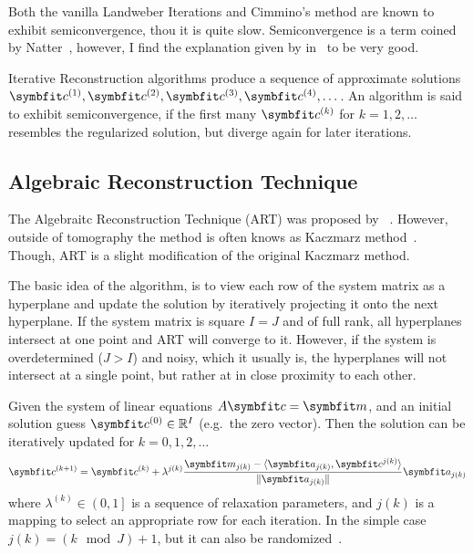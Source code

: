 Both the vanilla Landweber Iterations and Cimmino's method are known to exhibit semiconvergence,
thou it is quite slow. Semiconvergence is a term coined by Natter~\cite{natterer_mathematics_1986},
however, I find the explanation given by \citeauthor*{hansen_discrete_2010}
in~\cite[Chapter~6]{hansen_discrete_2010} to be very good.

\begin{definition}[Semiconvergence]\label{def:semiconvergence}
	Iterative Reconstruction algorithms produce a sequence of approximate solutions
	\(\mvec{c}^{(1)}, \mvec{c}^{(2)}, \mvec{c}^{(3)}, \mvec{c}^{(4)}, \dots\). An algorithm is
	said to exhibit semiconvergence, if the first many \(\mvec{c}^{(k)}\) for \(k = 1, 2,
	\dots\) resembles the regularized solution, but diverge again for later iterations.
\end{definition}

\subsection{Algebraic Reconstruction Technique}\label{subsec:algebraic_reconstruction_technique}

The Algebraitc Reconstruction Technique (ART) was proposed by
\citeauthor*{gordon_algebraic_1970}~\cite{gordon_algebraic_1970}. However, outside of tomography the
method is often knows as Kaczmarz method~\cite{kaczmarz_approximate_1993}. Though, \gls{ART} is a
slight modification of the original Kaczmarz method.

The basic idea of the algorithm, is to view each row of the system matrix as a hyperplane and update
the solution by iteratively projecting it onto the next hyperplane. If the system matrix is square
\(I = J\) and of full rank, all hyperplanes intersect at one point and \gls{ART} will converge to
it. However, if the system is overdetermined (\(J > I\)) and noisy, which it usually is, the
hyperplanes will not intersect at a single point, but rather at in close proximity to each other.

\begin{definition}\label{def:art}
	Given the system of linear equations \(A\mvec{c} = \mvec{m}\), and an initial solution guess
	\(\mvec{c}^{(0)} \in \mathbb{R}^I\) (e.g.\ the zero vector). Then the solution can be
	iteratively updated for \(k = 0, 1, 2, \dots\)
	\[
		\mvec{c}^{(k+1)} = \mvec{c}^{(k)} + \lambda^{j(k)} \frac{\mvec{m}_{j(k)} - \langle \mvec{a}_{j(k)}, \mvec{c}^{j(k)} \rangle}{\norm{\mvec{a}_{j(k)}}}\mvec{a}_{j(k)}
	\]
	where \(\lambda^{(k)} \in \left(0, 1\right]\) is a sequence of relaxation parameters, and
	\(j(k)\) is a mapping to select an appropriate row for each iteration. In the simple case
	\(j(k) = (k \mod J) + 1\), but it can also be randomized~\cite{strohmer_randomized_2007}.
\end{definition}

